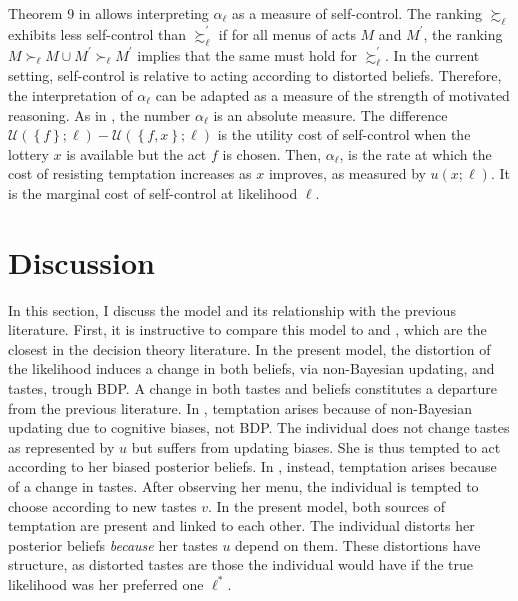 Theorem 9 in \cite{gulTemptationSelfControl2001} allows interpreting \( \alpha_{\ell} \) as a measure of self-control. The ranking \( \succsim_{\ell} \) exhibits less self-control than \( \succsim^{\prime}_{\ell} \) if for all menus of acts \( M \) and \( M^{\prime} \), the ranking \( M \succ_{\ell} M \cup M^{\prime} \succ_{\ell} M^{\prime} \) implies that the same must hold for \( \succsim^{\prime}_{\ell} \). In the current setting, self-control is relative to acting according to distorted beliefs. Therefore, the interpretation of \( \alpha_{\ell} \) can be adapted as a measure of the strength of motivated reasoning. As in \cite{epsteinAxiomaticModelNonBayesian2006}, the number \( \alpha_{\ell} \) is an absolute measure. The difference \( \mathcal{U} \left( \left\{f \right\} ; \ell \right) - \mathcal{U} \left( \left\{f, x \right\} ; \ell \right) \) is the utility cost of self-control when the lottery \( x \) is available but the act \( f \) is chosen. Then, \( \alpha_{\ell} \), is the rate at which the cost of resisting temptation increases as \( x \) improves, as measured by \( u \left( x ; \ell \right) \). It is the marginal cost of self-control at likelihood \( \ell \).

\section{Discussion}\label{sec:discuss}

In this section, I discuss the model and its relationship with the previous literature. First, it is instructive to compare this model to \cite{epsteinAxiomaticModelNonBayesian2006} and \cite{gulTemptationSelfControl2001}, which are the closest in the decision theory literature. In the present model, the distortion of the likelihood induces a change in both beliefs, via non-Bayesian updating, and tastes, trough BDP. A change in both tastes and beliefs constitutes a departure from the previous literature. In \cite{epsteinAxiomaticModelNonBayesian2006}, temptation arises because of non-Bayesian updating due to cognitive biases, not BDP. The individual does not change tastes as represented by \( u \) but suffers from updating biases. She is thus tempted to act according to her biased posterior beliefs. In \cite{gulTemptationSelfControl2001}, instead, temptation arises because of a change in tastes. After observing her menu, the individual is tempted to choose according to new tastes \( v \). In the present model, both sources of temptation are present and linked to each other. The individual distorts her posterior beliefs \textit{because} her tastes \( u \) depend on them. These distortions have structure, as distorted tastes are those the individual would have if the true likelihood was her preferred one \( \ell^{*} \).

